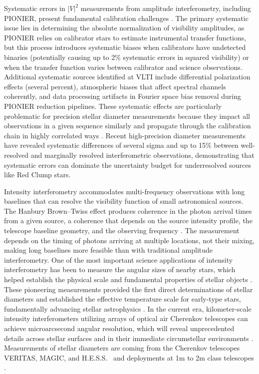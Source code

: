 \documentclass[linenumbers,trackchanges]{aastex701}
\begin{document}
Systematic errors in $|V|^2$ measurements from amplitude interferometry, including PIONIER, present fundamental calibration challenges \citep{10.1093/mnras/stz114}. The primary systematic issue lies in determining the absolute normalization of visibility amplitudes, as PIONIER relies on calibrator stars to estimate instrumental transfer functions, but this process introduces systematic biases when calibrators have undetected binaries (potentially causing up to 2\% systematic errors in squared visibility) or when the transfer function varies between calibrator and science observations. Additional systematic sources identified at VLTI include differential polarization effects (several percent), atmospheric biases that affect spectral channels coherently, and data processing artifacts in Fourier space bias removal during PIONIER reduction pipelines. These systematic effects are particularly problematic for precision stellar diameter measurements because they impact all observations in a given sequence similarly and propagate through the calibration chain in highly correlated ways \citep{10.1093/mnras/stz114}. Recent high-precision diameter measurements have revealed systematic differences of several sigma and up to 15\% between well-resolved and marginally resolved interferometric observations, demonstrating that systematic errors can dominate the uncertainty budget for underresolved sources like Red Clump stars.

Intensity interferometry accommodates multi-frequency observations with long baselines that can resolve the visibility function of small astronomical sources. The Hanbury Brown--Twiss effect produces coherence in the photon arrival times from a given source, a coherence that depends on the source intensity profile, the telescope baseline geometry, and the observing frequency \citep{1956Natur.177...27B, 1956Natur.178.1046H}. The measurement depends on the timing of photons arriving at multiple locations, not their mixing, making long baselines more feasible than with traditional amplitude interferometry.
One of the most important science applications of intensity interferometry has been to measure the angular sizes of nearby stars, which helped establish the physical scale and fundamental properties of stellar objects \citep{1967MNRAS.137..393H, 1974MNRAS.167..121H}. These pioneering measurements provided the first direct determinations of stellar diameters and established the effective temperature scale for early-type stars, fundamentally advancing stellar astrophysics \citep{1976ApJ...203..417C}.
In the current era, kilometer-scale intensity interferometers utilizing arrays of optical air Cherenkov telescopes can achieve microarcsecond angular resolution, which will reveal unprecedented details across stellar surfaces and in their immediate circumstellar environments \citep{2012MNRAS.419..172N, 2016SPIE.9907E..0MD}.
Measurements of stellar diameters are coming from the
Cherenkov telescopes VERITAS,
MAGIC, and H.E.S.S.\ 
\cite{2020MNRAS.491.1540A, 2024MNRAS.52712243Z, 10.1093/mnras/stae2643,  2024ApJ...966...28A, 10.1093/mnras/stae2643}
and deployments at 1m to 2m class telescopes
\cite{2021MNRAS.506.1585Z, 2023AJ....165..117M}.
\end{document}
